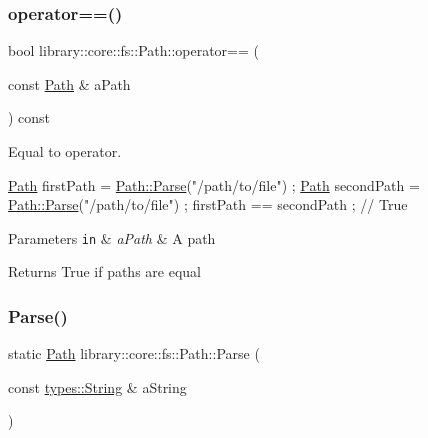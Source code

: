 \subsubsection{\texorpdfstring{operator==()}{operator==()}}
{\footnotesize\ttfamily bool library\+::core\+::fs\+::\+Path\+::operator== (\begin{DoxyParamCaption}\item[{const \hyperlink{classlibrary_1_1core_1_1fs_1_1Path}{Path} \&}]{a\+Path }\end{DoxyParamCaption}) const}



Equal to operator. 


\begin{DoxyCode}
\hyperlink{classlibrary_1_1core_1_1fs_1_1Path_aaba9a8e0153813f08f78f1c3275734a4}{Path} firstPath = \hyperlink{classlibrary_1_1core_1_1fs_1_1Path_aebf5bd3af83e0b7376616e146f3e55df}{Path::Parse}(\textcolor{stringliteral}{"/path/to/file"}) ;
\hyperlink{classlibrary_1_1core_1_1fs_1_1Path_aaba9a8e0153813f08f78f1c3275734a4}{Path} secondPath = \hyperlink{classlibrary_1_1core_1_1fs_1_1Path_aebf5bd3af83e0b7376616e146f3e55df}{Path::Parse}(\textcolor{stringliteral}{"/path/to/file"}) ;
firstPath == secondPath ; \textcolor{comment}{// True}
\end{DoxyCode}



\begin{DoxyParams}[1]{Parameters}
\mbox{\tt in}  & {\em a\+Path} & A path \\
\hline
\end{DoxyParams}
\begin{DoxyReturn}{Returns}
True if paths are equal 
\end{DoxyReturn}
\mbox{\label{classlibrary_1_1core_1_1fs_1_1Path_aebf5bd3af83e0b7376616e146f3e55df}} 
\subsubsection{\texorpdfstring{Parse()}{Parse()}}
{\footnotesize\ttfamily static \hyperlink{classlibrary_1_1core_1_1fs_1_1Path}{Path} library\+::core\+::fs\+::\+Path\+::\+Parse (\begin{DoxyParamCaption}\item[{const \hyperlink{classlibrary_1_1core_1_1types_1_1String}{types\+::\+String} \&}]{a\+String }\end{DoxyParamCaption})\hspace{0.3cm}{\ttfamily [static]}}



